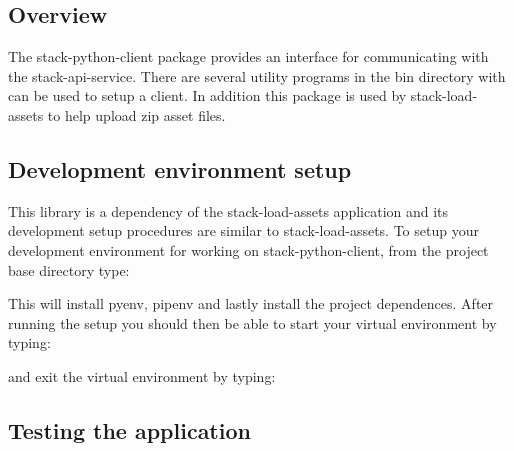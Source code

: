 \hypertarget{overview}{%
\subsection{Overview}\label{overview}}

The stack-python-client package provides an interface for communicating
with the stack-api-service. There are several utility programs in the
bin directory with can be used to setup a client. In addition this
package is used by stack-load-assets to help upload zip asset files.

\hypertarget{development-environment-setup}{%
\subsection{Development environment
setup}\label{development-environment-setup}}

This library is a dependency of the stack-load-assets application and
its development setup procedures are similar to stack-load-assets. To
setup your development environment for working on stack-python-client,
from the project base directory type:

\begin{Shaded}
\begin{Highlighting}[]
\end{Highlighting}
\end{Shaded}

This will install pyenv, pipenv and lastly install the project
dependences. After running the setup you should then be able to start
your virtual environment by typing:

\begin{Shaded}
\begin{Highlighting}[]
\end{Highlighting}
\end{Shaded}

and exit the virtual environment by typing:

\begin{Shaded}
\begin{Highlighting}[]
\end{Highlighting}
\end{Shaded}

\hypertarget{testing-the-application}{%
\subsection{Testing the application}\label{testing-the-application}}

